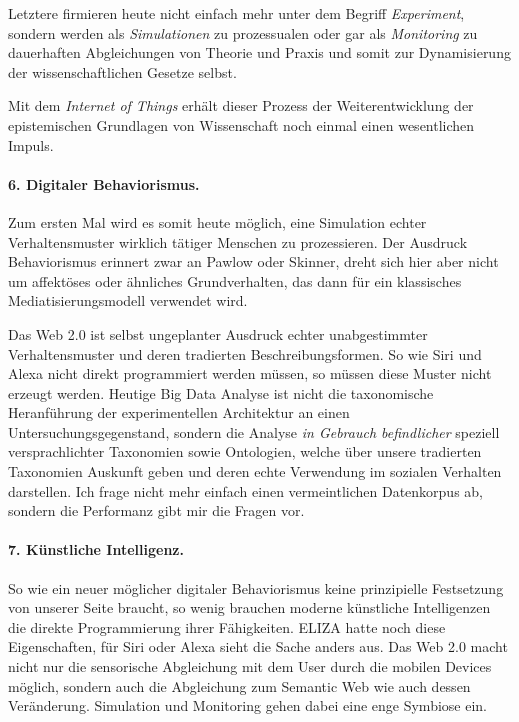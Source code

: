 \documentclass[12pt,a4paper]{article}
\begin{document}
Letztere firmieren heute nicht einfach mehr unter dem Begriff
\emph{Experiment}, sondern werden als \emph{Simulationen} zu prozessualen oder
gar als \emph{Monitoring} zu dauerhaften Abgleichungen von Theorie und Praxis
und somit zur Dynamisierung der wissenschaftlichen Gesetze selbst.

Mit dem \emph{Internet of Things} erhält dieser Prozess der Weiterentwicklung
der epistemischen Grundlagen von Wissenschaft noch einmal einen wesentlichen
Impuls.

\paragraph{6. Digitaler Behaviorismus.}

Zum ersten Mal wird es somit heute möglich, eine Simulation echter
Verhaltensmuster wirklich tätiger Menschen zu prozessieren. Der Ausdruck
Behaviorismus erinnert zwar an Pawlow oder Skinner, dreht sich hier aber nicht
um affektöses oder ähnliches Grundverhalten, das dann für ein klassisches
Mediatisierungsmodell verwendet wird.

Das Web 2.0 ist selbst ungeplanter Ausdruck echter unabgestimmter
Verhaltensmuster und deren tradierten Beschreibungsformen. So wie Siri und
Alexa nicht direkt programmiert werden müssen, so müssen diese Muster nicht
erzeugt werden. Heutige Big Data Analyse ist nicht die taxonomische
Heranführung der experimentellen Architektur an einen Untersuchungsgegenstand,
sondern die Analyse \emph{in Gebrauch befindlicher} speziell versprachlichter
Taxonomien sowie Ontologien, welche über unsere tradierten Taxonomien Auskunft
geben und deren echte Verwendung im sozialen Verhalten darstellen. Ich frage
nicht mehr einfach einen vermeintlichen Datenkorpus ab, sondern die Performanz
gibt mir die Fragen vor.

\paragraph{7. Künstliche Intelligenz.}

So wie ein neuer möglicher digitaler Behaviorismus keine prinzipielle
Festsetzung von unserer Seite braucht, so wenig brauchen moderne künstliche
Intelligenzen die direkte Programmierung ihrer Fähigkeiten.  ELIZA hatte noch
diese Eigenschaften, für Siri oder Alexa sieht die Sache anders aus. Das Web
2.0 macht nicht nur die sensorische Abgleichung mit dem User durch die mobilen
Devices möglich, sondern auch die Abgleichung zum Semantic Web wie auch dessen
Veränderung.  Simulation und Monitoring gehen dabei eine enge Symbiose ein.
\end{document}
